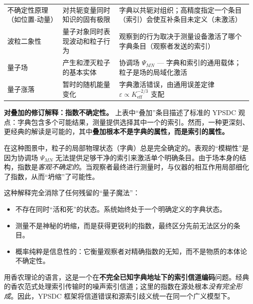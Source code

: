 \documentclass[12pt,a4paper]{article}
\theoremstyle{remark}
\begin{document}
\begin{longtable}{p{3.8cm} p{5cm} p{7cm}}
		不确定性原理（如位置-动量） &
		对共轭变量同时知识的固有极限 &
		字典以共轭对组织；高精度指定一个条目（索引）会使互补条目未定义（未激活） \\
		\addlinespace
		
		波粒二象性 &
		量子对象同时表现波动和粒子行为 &
		观察到的行为取决于测量设备激活了哪个字典条目（观察者发送的索引） \\
		\addlinespace
		
		量子场 &
		产生和湮灭粒子的基本实体 &
		协调场 \(\Psi_{MN}\) — 字典和索引的通用载体；粒子是场的局域化激活 \\
		\addlinespace
		
		量子涨落 &
		暂时的随机能量变化 &
		字典激活错误，由通用误差定律 \(\varepsilon \propto K_{\mathrm{eff}}^{-2/3}\) 支配 \\
	\end{longtable}
	
	\noindent
	\textbf{对叠加的修订解释：指数不确定性。}
	上表中“叠加”条目描述了标准的 YPSDC 观点：字典包含多个可能结果，测量提供选择其中一个的索引。然而，一种更深刻、更经典的解读是可能的，其中\textbf{叠加根本不是字典的属性，而是索引的属性。}
	
	在这种图景中，粒子的局部物理状态（字典）总是完全确定的。表观的“模糊性”是因为协调场 \(\Psi_{MN}\) 无法提供足够干净的索引来激活单个明确条目。由于场本身的结构，指数是\textit{客观不确定的}。当观察者最终进行测量时，与仪器的相互作用局部细化了指数，从而“坍缩”了可能性。
	
	这种解释完全消除了任何残留的“量子魔法”：
	\begin{itemize}[leftmargin=*]
		\item 不存在同时“活和死”的状态。系统始终处于一个明确定义的字典状态。
		\item 测量不是神秘的坍缩，而是获得更锐利的指数，最终区分先前无法区分的条目。
		\item 概率纯粹是信息性的：它衡量观察者对精确指数的无知，而不是物质的本体论不确定性。
	\end{itemize}
	
	用香农理论的语言，这是一个在\textbf{不完全已知字典地址下的索引信道编码}问题。经典的香农范式处理索引传输时的噪声索引信道；这里的指数在源处根本\textit{没有完全形成}。因此，YPSDC 框架将信道错误和源索引歧义统一在同一个广义模型下。
	
	\medskip
	
\end{document}
